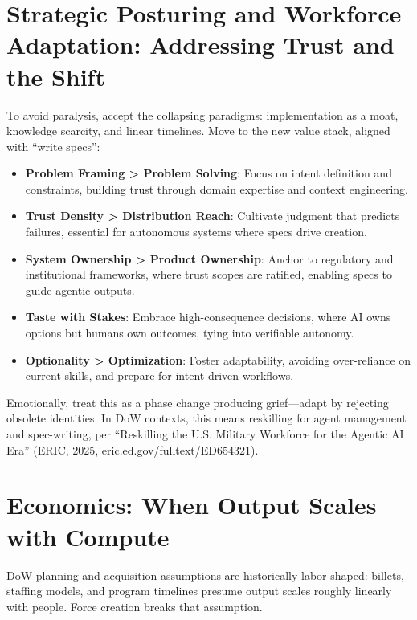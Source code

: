 \documentclass[11pt]{article}
\begin{document}
\section{Strategic Posturing and Workforce Adaptation: Addressing Trust and the Shift}\label{strategic-posturing-and-workforce-adaptation-addressing-trust-and-the-shift}

To avoid paralysis, accept the collapsing paradigms: implementation as a moat, knowledge scarcity, and linear timelines. Move to the new value stack, aligned with ``write specs'':

\begin{itemize}
\item
  \textbf{Problem Framing \textgreater{} Problem Solving}: Focus on intent definition and constraints, building trust through domain expertise and context engineering.
\item
  \textbf{Trust Density \textgreater{} Distribution Reach}: Cultivate judgment that predicts failures, essential for autonomous systems where specs drive creation.
\item
  \textbf{System Ownership \textgreater{} Product Ownership}: Anchor to regulatory and institutional frameworks, where trust scopes are ratified, enabling specs to guide agentic outputs.
\item
  \textbf{Taste with Stakes}: Embrace high-consequence decisions, where AI owns options but humans own outcomes, tying into verifiable autonomy.
\item
  \textbf{Optionality \textgreater{} Optimization}: Foster adaptability, avoiding over-reliance on current skills, and prepare for intent-driven workflows.
\end{itemize}

Emotionally, treat this as a phase change producing grief---adapt by rejecting obsolete identities. In DoW contexts, this means reskilling for agent management and spec-writing, per ``Reskilling the U.S. Military Workforce for the Agentic AI Era'' (ERIC, 2025, eric.ed.gov/fulltext/ED654321).


\section{Economics: When Output Scales with Compute}\label{economics}

DoW planning and acquisition assumptions are historically labor-shaped: billets, staffing models, and program timelines presume output scales roughly linearly with people. Force creation breaks that assumption.
\end{document}
